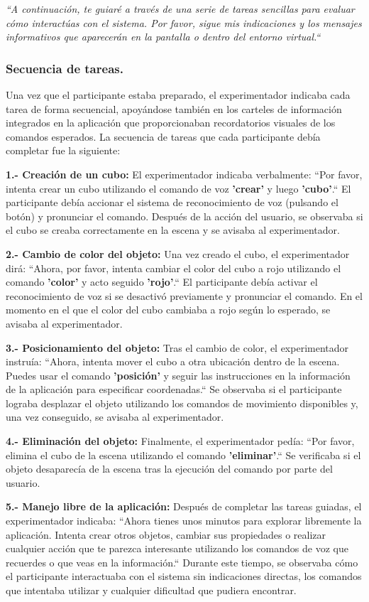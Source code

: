 \documentclass[a4paper, 12pt]{book}
\begin{document}
\textit{``A continuación, te guiaré a través de una serie de tareas sencillas para evaluar cómo interactúas con el sistema. Por favor, sigue mis indicaciones y los mensajes informativos que aparecerán en la pantalla o dentro del entorno virtual.``}
\clearpage
\subsubsection{Secuencia de tareas.}
Una vez que el participante estaba preparado, el experimentador indicaba cada tarea de forma secuencial, apoyándose también en los carteles de información integrados en la aplicación que proporcionaban recordatorios visuales de los comandos esperados. La secuencia de tareas que cada participante debía completar fue la siguiente:

\textbf{1.- Creación de un cubo:} El experimentador indicaba verbalmente: ``Por favor, intenta crear un cubo utilizando el comando de voz \textbf{'crear'} y luego \textbf{'cubo'}.``
El participante debía accionar el sistema de reconocimiento de voz (pulsando el botón) y pronunciar el comando. Después de la acción del usuario, se observaba si el cubo se creaba correctamente en la escena y se avisaba al experimentador.

\textbf{2.- Cambio de color del objeto:} Una vez creado el cubo, el experimentador dirá: ``Ahora, por favor, intenta cambiar el color del cubo a rojo utilizando el comando \textbf{'color'} y acto seguido \textbf{'rojo'}.``
El participante debía activar el reconocimiento de voz si se desactivó previamente y pronunciar el comando. En el momento en el que el color del cubo cambiaba a rojo según lo esperado, se avisaba al experimentador.

\textbf{3.- Posicionamiento del objeto:} Tras el cambio de color, el experimentador instruía: ``Ahora, intenta mover el cubo a otra ubicación dentro de la escena. Puedes usar el comando \textbf{'posición'} y seguir las instrucciones en la información de la aplicación para especificar coordenadas.`` Se observaba si el participante lograba desplazar el objeto utilizando los comandos de movimiento disponibles y, una vez conseguido, se avisaba al experimentador.

\textbf{4.- Eliminación del objeto:} Finalmente, el experimentador pedía: ``Por favor, elimina el cubo de la escena utilizando el comando \textbf{'eliminar'}.`` Se verificaba si el objeto desaparecía de la escena tras la ejecución del comando por parte del usuario.

\textbf{5.- Manejo libre de la aplicación:} Después de completar las tareas guiadas, el experimentador indicaba: ``Ahora tienes unos minutos para explorar libremente la aplicación. Intenta crear otros objetos, cambiar sus propiedades o realizar cualquier acción que te parezca interesante utilizando los comandos de voz que recuerdes o que veas en la información.``
Durante este tiempo, se observaba cómo el participante interactuaba con el sistema sin indicaciones directas, los comandos que intentaba utilizar y cualquier dificultad que pudiera encontrar.
\end{document}
